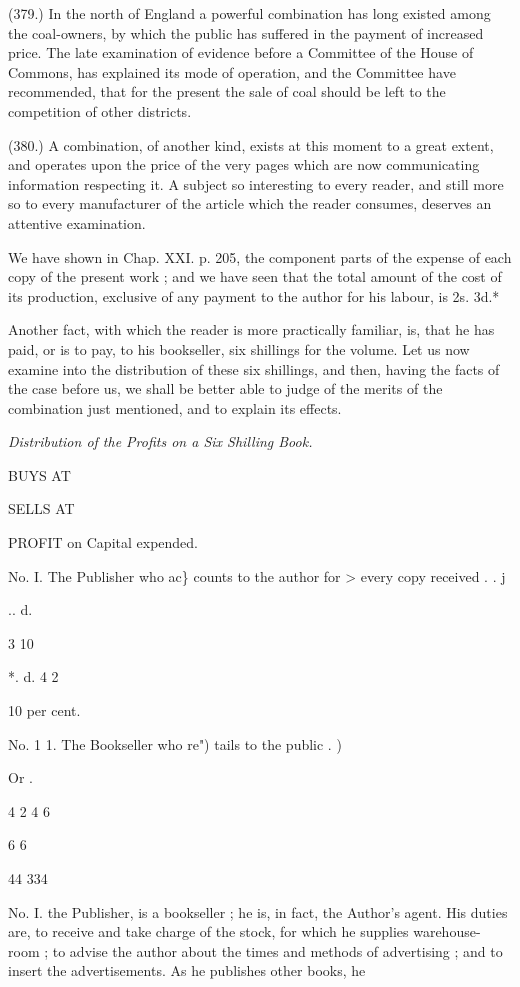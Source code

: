 \documentclass{article}
\begin{document}
(379.) In the north of England a powerful combination has long existed among the coal-owners, by which the public has suffered in the payment of increased price. The late examination of evidence before a Committee of the House of Commons, has explained its mode of operation, and the Committee have recommended, that for the present the sale of coal should be left to the competition of other districts.


(380.) A combination, of another kind, exists at this moment to a great extent, and operates upon the price of the very pages which are now communicating information respecting it. A subject so interesting to every reader, and still more so to every manufacturer of the article which the reader consumes, deserves an attentive examination.


We have shown in Chap. XXI. p. 205, the component parts of the expense of each copy of the present work ; and we have seen that the total amount of the cost of its production, exclusive of any payment to the author for his labour, is 2s. 3d.*


Another fact, with which the reader is more practically familiar, is, that he has paid, or is to pay, to his bookseller, six shillings for the volume. Let us now examine into the distribution of these six shillings, and then, having the facts of the case before us, we shall be better able to judge of the merits of the combination just mentioned, and to explain its effects.


\emph{Distribution of the Profits on a Six Shilling Book.}




BUYS AT


SELLS AT


PROFIT on Capital expended.


No. I. The Publisher who ac\} counts to the author for > every copy received . . j


.. d.


3 10


*. d. 4 2


10 per cent.


No. 1 1. The Bookseller who re") tails to the public . )


Or .


4 2 4 6


6 6


44 334


No. I. the Publisher, is a bookseller ; he is, in fact, the Author's agent. His duties are, to receive and take charge of the stock, for which he supplies warehouse-room ; to advise the author about the times and methods of advertising ; and to insert the advertisements. As he publishes other books, he
\end{document}
